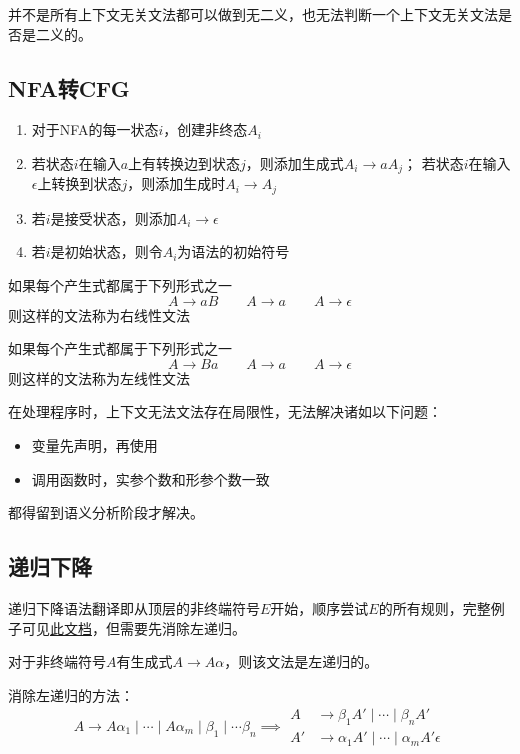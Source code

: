 并不是所有上下文无关文法都可以做到无二义，也无法判断一个上下文无关文法是否是二义的。

\subsection{NFA转CFG}
\begin{enumerate}
	\item 对于NFA的每一状态$i$，创建非终态$A_i$
	\item 若状态$i$在输入$a$上有转换边到状态$j$，则添加生成式$A_i\to aA_j$；
	若状态$i$在输入$\epsilon$上转换到状态$j$，则添加生成时$A_i\to A_j$
	\item 若$i$是接受状态，则添加$A_i\to\epsilon$
	\item 若$i$是初始状态，则令$A_i$为语法的初始符号
\end{enumerate}

\begin{definition}[右线性文法]
如果每个产生式都属于下列形式之一
\[A\to aB\qquad A\to a\qquad A\to\epsilon\]
则这样的文法称为右线性文法
\end{definition}
\begin{definition}[左线性文法]
如果每个产生式都属于下列形式之一
\[A\to Ba\qquad A\to a\qquad A\to\epsilon\]
则这样的文法称为左线性文法
\end{definition}

在处理程序时，上下文无法文法存在局限性，无法解决诸如以下问题：
\begin{itemize}
\item 变量先声明，再使用
\item 调用函数时，实参个数和形参个数一致
\end{itemize}
都得留到语义分析阶段才解决。

\subsection{递归下降}
递归下降语法翻译即从顶层的非终端符号$E$开始，顺序尝试$E$的所有规则，完整例子可见\href{http://web.stanford.edu/class/cs143/lectures/lecture06.pdf}{此文档}，但需要先消除左递归。

\begin{definition}[左递归]
对于非终端符号$A$有生成式$A\to A\alpha$，则该文法是左递归的。
\end{definition}
消除左递归的方法：
\[A\to A\alpha_1\mid \cdots\mid A\alpha_m\mid\beta_1\mid\cdots\beta_n
\implies
\begin{aligned}
A &\to\beta_1 A'\mid\cdots\mid\beta_n A'\\
A' &\to\alpha_1 A'\mid\cdots\mid\alpha_m A'\epsilon
\end{aligned}\]

